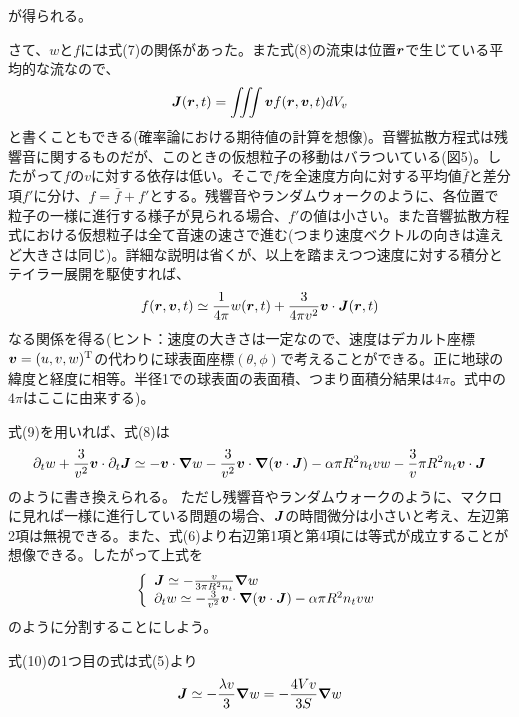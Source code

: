 \documentclass[dvipdfmx, 9pt, a4paper]{jsarticle}
\newcommand{\bm}[1]{{\mbox{\boldmath $#1$}}}
\begin{document}
が得られる。\par
さて、$w$と$f$には式(7)の関係があった。また式(8)の流束は位置$\bm r$で生じている平均的な流なので、
\begin{equation}
\bm J(\bm r, t)=\iiint \bm vf(\bm r, \bm v, t)dV_v \notag
\end{equation}
と書くこともできる(確率論における期待値の計算を想像)。音響拡散方程式は残響音に関するものだが、このときの仮想粒子の移動はバラついている(図5)。したがって$f$の$v$に対する依存は低い。そこで$f$を全速度方向に対する平均値$\bar f$と差分項$f'$に分け、$f=\bar f + f'$とする。残響音やランダムウォークのように、各位置で粒子の一様に進行する様子が見られる場合、$f'$の値は小さい。また音響拡散方程式における仮想粒子は全て音速の速さで進む(つまり速度ベクトルの向きは違えど大きさは同じ)。詳細な説明は省くが、以上を踏まえつつ速度に対する積分とテイラー展開を駆使すれば、
\begin{equation}
f(\bm r, \bm v, t) \simeq \frac{1}{4\pi}w(\bm r, t)+\frac{3}{4\pi v^2}\bm v \cdot \bm J(\bm r, t)
\end{equation}
なる関係を得る(ヒント：速度の大きさは一定なので、速度はデカルト座標$\bm v=(u, v, w)^{\rm T}$の代わりに球表面座標$(\theta, \phi)$で考えることができる。正に地球の緯度と経度に相等。半径1での球表面の表面積、つまり面積分結果は$4\pi$。式中の$4\pi$はここに由来する)。\par
式(9)を用いれば、式(8)は
\begin{equation}
\partial_t w+\frac{3}{v^2}\bm v \cdot \partial_t\bm J\simeq -\bm v \cdot \bm \nabla w-\frac{3}{v^2}\bm v \cdot \bm \nabla(\bm v \cdot \bm J)-\alpha \pi R^2 n_tvw-\frac{3}{v}\pi R^2n_t\bm v \cdot \bm J \notag
\end{equation}
のように書き換えられる。
ただし残響音やランダムウォークのように、マクロに見れば一様に進行している問題の場合、$\bm J$の時間微分は小さいと考え、左辺第2項は無視できる。また、式(6)より右辺第1項と第4項には等式が成立することが想像できる。したがって上式を
\begin{equation}
\left\{
\begin{array}{l}
\bm J \simeq -\frac{v}{3\pi R^2 n_t}\bm \nabla w \\
\partial_t w \simeq -\frac{3}{v^2}\bm v \cdot \bm \nabla(\bm v \cdot \bm J)-\alpha \pi R^2 n_tvw
\end{array}\right.
\end{equation}
のように分割することにしよう。\par
式(10)の1つ目の式は式(5)より
\begin{equation}
\bm J \simeq -\frac{\lambda v}{3}\bm \nabla w=-\frac{4Vv}{3S}\bm \nabla w
\end{equation}
\end{document}
